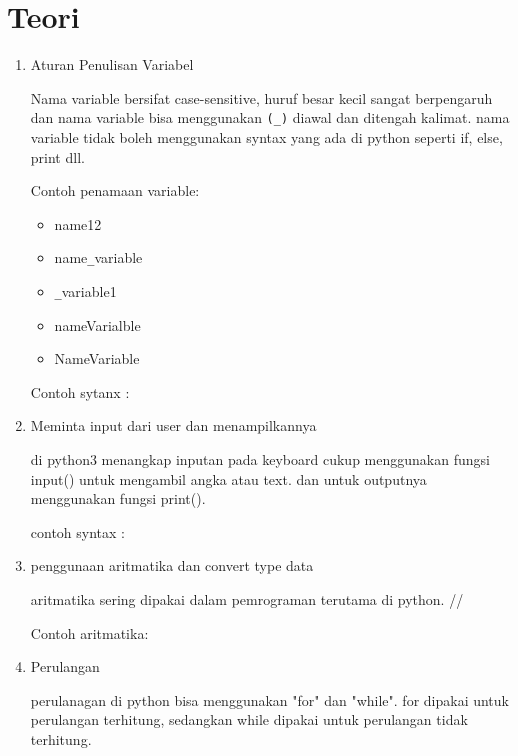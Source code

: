 \section{Teori}
\begin{enumerate}

\item Aturan Penulisan Variabel
\begin{flushleft}
\qquad Nama variable bersifat case-sensitive, huruf besar kecil sangat berpengaruh dan nama variable bisa menggunakan \verb|(_)| diawal dan ditengah kalimat. nama variable tidak boleh menggunakan syntax yang ada di python seperti if, else, print dll.\\
\end{flushleft}
Contoh penamaan variable:
	\begin{itemize}
	\item name12
	\item name\verb|_|variable
	\item \verb|_|variable1
	\item nameVarialble
	\item NameVariable
	\end{itemize}
	
Contoh sytanx :



\item Meminta input dari user dan menampilkannya
\begin{flushleft}
\qquad di python3 menangkap inputan pada keyboard cukup menggunakan fungsi input() untuk mengambil angka atau text. dan untuk outputnya menggunakan fungsi print().\\
\end{flushleft}
contoh syntax :



\item penggunaan aritmatika dan convert type data
\begin{flushleft}
\qquad aritmatika sering dipakai dalam pemrograman terutama di python. //
\end{flushleft}
Contoh aritmatika:



\item Perulangan 
\begin{flushleft}
\qquad perulanagan di python bisa menggunakan "for" dan "while". for dipakai untuk perulangan terhitung, sedangkan while dipakai untuk perulangan tidak terhitung.\\
\end{flushleft}




\end{enumerate}
